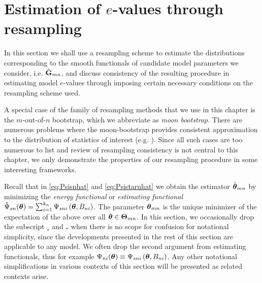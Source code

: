 \section{Estimation of $e$-values through resampling}
\label{section:BootSection}

In this section we shall use a resampling scheme to estimate the distributions corresponding to the smooth functionals of candidate model parameters we consider, i.e. $\hat {{\mathbf{G}}}_{m n}$, and discuss consistency of the resulting procedure in estimating model $e$-values through imposing certain necessary conditions on the resampling scheme used.

A special case of the family of resampling methods that we use in this chapter is the $m$-out-of-$n$ bootstrap, which we abbreviate as {\textit{moon bootstrap}}. There are numerous problems where the moon-bootstrap provides consistent approximation to the distribution of statistics of interest (e.g. \cite{shao96, ChatterjeeBose05}). Since all such cases are too numerous to list and review of resampling consistency is not central to this chapter, we only demonstrate the properties of our resampling procedure in some interesting frameworks.

Recall that in \ref{eq:Psisnhat} and \ref{eq:Psistarnhat} we obtain the estimator $\hat{{\boldsymbol{\theta}}}_{m n}$ by {min}imizing the \textit{energy functional} or \textit{estimating functional} $\hat{\Psi}_{s n} ({\boldsymbol{\theta}})= \sum_{i = 1}^{k_{n}} \Psi_{s n i}  \left( {\boldsymbol{\theta}}, B_{ni} \right)$. The parameter ${\boldsymbol{\theta}}_{m n}$ is the unique minimizer of the expectation of the above over all ${\boldsymbol{\theta}} \in {\boldsymbol{\Theta}}_{m n}$. In this section, we occasionally drop the subscript ${}_{s}$ and ${}_{*}$ when there is no scope for confusion for notational simplicity, since the developments presented in the rest of this section are applicable to any model. We often drop the second argument from estimating functionals, thus for example $ \Psi_{n i}  ( {\boldsymbol{\theta}}) \equiv  \Psi_{s n i}  \left( {\boldsymbol{\theta}}, B_{ni} \right)$. Any other notational simplifications in various contexts of this section will be presented as related contexts arise.



